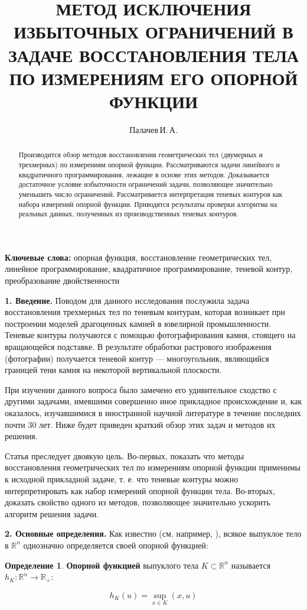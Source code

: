 \documentclass[a4paper, 10pt]{article}
\title{МЕТОД ИСКЛЮЧЕНИЯ ИЗБЫТОЧНЫХ ОГРАНИЧЕНИЙ В ЗАДАЧЕ ВОССТАНОВЛЕНИЯ ТЕЛА ПО 
ИЗМЕРЕНИЯМ ЕГО ОПОРНОЙ ФУНКЦИИ}
\author{Палачев\,И.\,А.}
\theoremstyle{definition}
\newtheorem{SmartDefinition}{Определение}
\theoremstyle{plain}
\theoremstyle{plain}
\begin{document}
\maketitle
\begin{abstract}
 Производится обзор методов восстановления геометрических тел (двумерных и
 трехмерных) по измерениям опорной функции. Рассматриваются задачи линейного
 и квадратичного программирования, лежащие в основе этих методов. Доказывается
 достаточное условие избыточности ограничений задачи, позволяющее значительно
 уменьшить число ограничений. Рассматривается интерпретация теневых контуров
 как набора измерений опорной функции. Приводятся результаты проверки
 алгоритма на реальных данных, полученных из производственных теневых контуров.
\end{abstract}

\textbf{Ключевые слова:} опорная функция, восстановление геометрических тел,
линейное программирование, квадратичное программирование, теневой контур,
преобразование двойственности

\textbf{1. Введение.} Поводом для данного исследования послужила задача
восстановления трехмерных тел по теневым контурам, которая возникает при
построении моделей драгоценных камней в ювелирной промышленности. Теневые
контуры получаются с помощью фотографирования камня, стоящего на вращающейся
подставке. В результате обработки растрового изображения (фотографии) получается
теневой контур --- многоугольник, являющийся границей тени камня на некоторой
вертикальной плоскости.

При изучении данного вопроса было замечено его удивительное сходство с другими
задачами, имевшими совершенно иное прикладное происхождение и, как оказалось,
изучавшимися в иностранной научной литературе в течение последних почти 30 лет.
Ниже будет приведен краткий обзор этих задач и методов их решения.

Статья преследует двоякую цель. Во-первых, показать что методы
восстановления геометрических тел по измерениям опорной функции применимы к
исходной прикладной задаче, т. е. что теневые контуры можно интерпретировать
как набор измерений опорной функции тела. Во-вторых, доказать свойство
одного из методов, позволяющее значительно ускорить алгоритм решения задачи.

\textbf{2. Основные определения.} Как известно (см. например,
\cite{Ghosh:1998:SFR:307150.307167}), всякое выпуклое тело в $\mathbb{R}^{n}$
однозначно определяется своей опорной функцией:

\begin{SmartDefinition}
 \label{def:support-function}
 \textbf{Опорной функцией} выпуклого тела $K \subset \mathbb{R}^{n}$
 называется
 $h_{K}: \mathbb{R}^{n} \to \mathbb{R}_{+}$:

 \begin{equation}h_{K}(u) = \sup \limits_{x \in K}(x, u)\end{equation}
\end{SmartDefinition}
\end{document}
